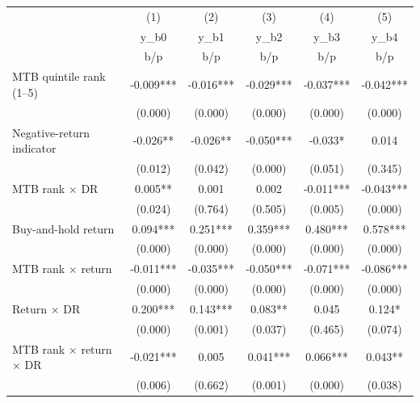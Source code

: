 {
\def\sym#1{\ifmmode^{#1}\else\(^{#1}\)\fi}
\begin{tabular}{l*{5}{c}}
\hline\hline
                    &\multicolumn{1}{c}{(1)}&\multicolumn{1}{c}{(2)}&\multicolumn{1}{c}{(3)}&\multicolumn{1}{c}{(4)}&\multicolumn{1}{c}{(5)}\\
                    &\multicolumn{1}{c}{y\_b0}&\multicolumn{1}{c}{y\_b1}&\multicolumn{1}{c}{y\_b2}&\multicolumn{1}{c}{y\_b3}&\multicolumn{1}{c}{y\_b4}\\
                    &         b/p   &         b/p   &         b/p   &         b/p   &         b/p   \\
\hline
MTB quintile rank (1–5)&      -0.009***&      -0.016***&      -0.029***&      -0.037***&      -0.042***\\
                    &     (0.000)   &     (0.000)   &     (0.000)   &     (0.000)   &     (0.000)   \\
Negative-return indicator&      -0.026** &      -0.026** &      -0.050***&      -0.033*  &       0.014   \\
                    &     (0.012)   &     (0.042)   &     (0.000)   &     (0.051)   &     (0.345)   \\
MTB rank × DR       &       0.005** &       0.001   &       0.002   &      -0.011***&      -0.043***\\
                    &     (0.024)   &     (0.764)   &     (0.505)   &     (0.005)   &     (0.000)   \\
Buy-and-hold return &       0.094***&       0.251***&       0.359***&       0.480***&       0.578***\\
                    &     (0.000)   &     (0.000)   &     (0.000)   &     (0.000)   &     (0.000)   \\
MTB rank × return   &      -0.011***&      -0.035***&      -0.050***&      -0.071***&      -0.086***\\
                    &     (0.000)   &     (0.000)   &     (0.000)   &     (0.000)   &     (0.000)   \\
Return × DR         &       0.200***&       0.143***&       0.083** &       0.045   &       0.124*  \\
                    &     (0.000)   &     (0.001)   &     (0.037)   &     (0.465)   &     (0.074)   \\
MTB rank × return × DR&      -0.021***&       0.005   &       0.041***&       0.066***&       0.043** \\
                    &     (0.006)   &     (0.662)   &     (0.001)   &     (0.000)   &     (0.038)   \\

\end{tabular}}
